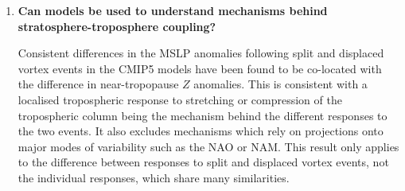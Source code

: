 \begin{enumerate}
\item \textbf{Can models be used to understand mechanisms behind
    stratosphere-troposphere coupling?}

  Consistent differences in the MSLP anomalies following split and displaced
  vortex events in the CMIP5 models have been found to be co-located with the
  difference in near-tropopause $Z$ anomalies. This is consistent with a
  localised tropospheric response to stretching or compression of the
  tropospheric column being the mechanism behind the different responses to the
  two events. It also excludes mechanisms which rely on projections onto major
  modes of variability such as the NAO or NAM. This result only applies to the
  difference between responses to split and displaced vortex events, not the
  individual responses, which share many similarities.
\end{enumerate}


